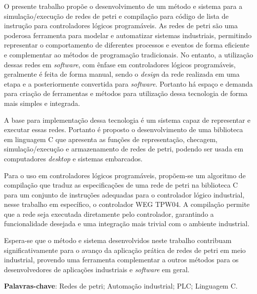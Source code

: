 \setlength{\absparsep}{18pt} %
\begin{resumo}

O presente trabalho propõe o desenvolvimento de um método e sistema para a simulação/execução de redes de petri e compilação para código de lista de instrução para controladores lógicos programáveis. As redes de petri são uma poderosa ferramenta para modelar e automatizar sistemas industriais, permitindo representar o comportamento de diferentes processos e eventos de forma eficiente e complementar ao métodos de programação tradicionais. No entanto, a utilização dessas redes em \textit{software}, com ênfase em controladores lógicos programáveis, geralmente é feita de forma manual, sendo o \textit{design} da rede realizada em uma etapa e a posteriormente convertida para \textit{software}. Portanto há espaço e demanda para criação de ferramentas e métodos para utilização dessa tecnologia de forma mais simples e integrada.

A base para implementação dessa tecnologia é um sistema capaz de representar e executar essas redes. Portanto é proposto o desenvolvimento de uma biblioteca em linguagem C que apresenta as funções de representação, checagem, simulação/execução e armazenamento de redes de petri, podendo ser usada em computadores \textit{desktop} e sistemas embarcados. 

Para o uso em controladores lógicos programáveis, propõem-se um algoritmo de compilação que traduz as especificações de uma rede de petri na biblioteca C para um conjunto de instruções adequadas para o controlador lógico industrial, nesse trabalho em específico, o controlador WEG TPW04. A compilação permite que a rede seja executada diretamente pelo controlador, garantindo a funcionalidade desejada e uma integração mais trivial com o ambiente industrial.

Espera-se que o método e sistema desenvolvidos neste trabalho contribuam significativamente para o avanço da aplicação prática de redes de petri em meio industrial, provendo uma ferramenta complementar a outros métodos para os desenvolvedores de aplicações industriais e \textit{software} em geral.
	
\textbf{Palavras-chave}: Redes de petri; Automação industrial; PLC; Linguagem C.
\end{resumo}

